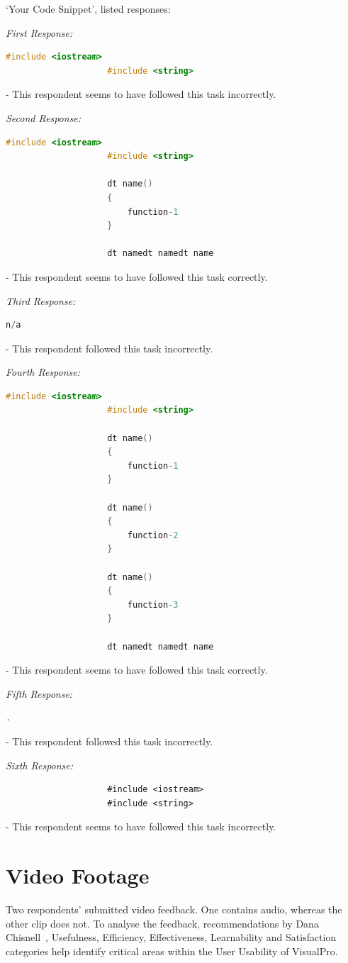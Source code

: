 \documentclass[12pt]{report} %
\begin{document}
				`Your Code Snippet', listed responses:

				\textit{First Response:}
				\begin{lstlisting}[language=c++]
					#include <iostream>
					#include <string>
				\end{lstlisting} - This respondent seems to have followed this task incorrectly.

				\textit{Second Response:}
				\begin{lstlisting}[language=c++]
					#include <iostream>
					#include <string>

					dt name()
					{
						function-1
					}

					dt namedt namedt name
				\end{lstlisting} - This respondent seems to have followed this task correctly.

				\textit{Third Response:}
				\begin{lstlisting}[language=c++]
					n/a			
				\end{lstlisting} - This respondent followed this task incorrectly.

				\textit{Fourth Response:}
				\begin{lstlisting}[language=c++]
					#include <iostream>
					#include <string>

					dt name()
					{
						function-1
					}

					dt name()
					{
						function-2
					}

					dt name()
					{
						function-3
					}

					dt namedt namedt name
				\end{lstlisting} - This respondent seems to have followed this task correctly.

				\textit{Fifth Response:}
				\begin{lstlisting}[language=c++]
					.
				\end{lstlisting} - This respondent followed this task incorrectly.

				\textit{Sixth Response:}
				\begin{lstlisting}
					#include <iostream>
					#include <string>
				\end{lstlisting} - This respondent seems to have followed this task incorrectly.

		\section{Video Footage}
			Two respondents' submitted video feedback. One contains audio, whereas the other clip does not. To analyse the feedback, recommendations by Dana Chisnell~\cite{chisnell_dana_handbook_2008}, Usefulness, Efficiency, Effectiveness, Learnability and Satisfaction categories help identify critical areas within the User Usability of VisualPro.
\end{document}
